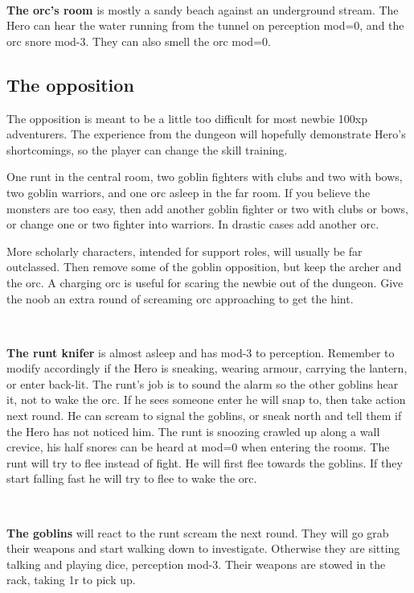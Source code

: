 \

\textbf{The orc's room} is mostly a sandy beach against an underground stream. The Hero can hear the water running from the tunnel on perception mod=0, and the orc snore mod-3. They can also smell the orc mod=0.



\subsection*{The opposition}

The opposition is meant to be a little too difficult for most newbie 100xp adventurers. The experience from the dungeon will hopefully demonstrate Hero's shortcomings, so the player can change the skill training.

One runt in the central room, two goblin fighters with clubs and two with bows, two goblin warriors, and one orc asleep in the far room.
If you believe the monsters are too easy, then add another goblin fighter or two with clubs or bows, or change one or two fighter into warriors. In drastic cases add another orc.

More scholarly characters, intended for support roles, will usually be far outclassed. Then remove some of the goblin opposition, but keep the archer and the orc. A charging orc is useful for scaring the newbie out of the dungeon. Give the noob an extra round of screaming orc approaching to get the hint.

\

\textbf{The runt knifer} is almost asleep and has mod-3 to perception. Remember to modify accordingly if the Hero is sneaking, wearing armour, carrying the lantern, or enter back-lit. The runt's job is to sound the alarm so the other goblins hear it, not to wake the orc. If he sees someone enter he will snap to, then take action next round. He can scream to signal the goblins, or sneak north and tell them if the Hero has not noticed him. The runt is snoozing crawled up along a wall crevice, his half snores can be heard at mod=0 when entering the rooms.
The runt will try to flee instead of fight. He will first flee towards the goblins. If they start falling fast he will try to flee to wake the orc.

\

\textbf{The goblins} will react to the runt scream the next round. They will go grab their weapons and start walking down to investigate. Otherwise they are sitting talking and playing dice, perception mod-3. Their weapons are stowed in the rack, taking 1r to pick up.

